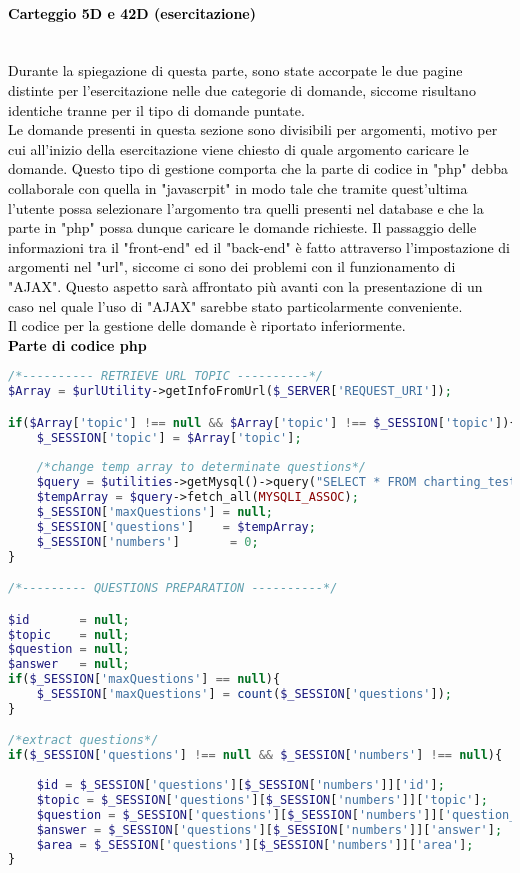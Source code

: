 \paragraph{\textcolor{black}{Carteggio 5D e 42D (esercitazione)}}\leavevmode\\
\textcolor{black}{Durante la spiegazione di questa parte, sono state accorpate le due pagine distinte per l'esercitazione nelle due categorie di domande, siccome risultano identiche tranne per il tipo di domande puntate.\\
Le domande presenti in questa sezione sono divisibili per argomenti, motivo per cui all'inizio della esercitazione viene chiesto di quale argomento caricare le domande. Questo tipo di gestione comporta che la parte di codice in "php" debba collaborale con quella in "javascrpit" in modo tale che tramite quest'ultima l'utente possa selezionare l'argomento tra quelli presenti nel database e che la parte in "php" possa dunque caricare le domande richieste. Il passaggio delle informazioni tra il "front-end" ed il "back-end" è fatto attraverso l'impostazione di argomenti nel "url", siccome ci sono dei problemi con il funzionamento di "AJAX". Questo aspetto sarà affrontato più avanti con la presentazione di un caso nel quale l'uso di "AJAX" sarebbe stato particolarmente conveniente.\\
Il codice per la gestione delle domande è riportato inferiormente.}\\

\textbf{\textcolor{black}{Parte di codice php}}\\

\begin{lstlisting}[language=php]
/*---------- RETRIEVE URL TOPIC ----------*/
$Array = $urlUtility->getInfoFromUrl($_SERVER['REQUEST_URI']);

if($Array['topic'] !== null && $Array['topic'] !== $_SESSION['topic']){
	$_SESSION['topic'] = $Array['topic'];
	
	/*change temp array to determinate questions*/
	$query = $utilities->getMysql()->query("SELECT * FROM charting_test_5d WHERE (topic = '{$Array['topic']}')");
	$tempArray = $query->fetch_all(MYSQLI_ASSOC);
	$_SESSION['maxQuestions'] = null;
	$_SESSION['questions']    = $tempArray;
	$_SESSION['numbers']       = 0;
}

/*--------- QUESTIONS PREPARATION ----------*/

$id       = null;
$topic    = null;
$question = null;
$answer   = null;
if($_SESSION['maxQuestions'] == null){
	$_SESSION['maxQuestions'] = count($_SESSION['questions']);
}

/*extract questions*/
if($_SESSION['questions'] !== null && $_SESSION['numbers'] !== null){
	
	$id = $_SESSION['questions'][$_SESSION['numbers']]['id'];
	$topic = $_SESSION['questions'][$_SESSION['numbers']]['topic'];
	$question = $_SESSION['questions'][$_SESSION['numbers']]['question_text'];
	$answer = $_SESSION['questions'][$_SESSION['numbers']]['answer'];
	$area = $_SESSION['questions'][$_SESSION['numbers']]['area'];	
}
\end{lstlisting}

